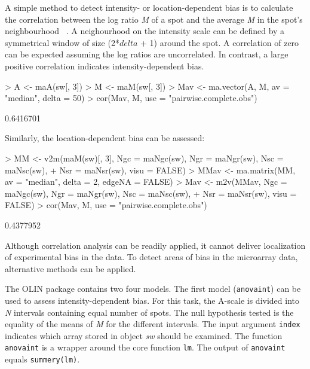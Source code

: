 \documentclass[a4paper,11pt]{article}
\begin{document}
A simple method to detect intensity- or location-dependent  bias is to calculate the 
correlation between the log ratio \emph{M} of a spot and the average \emph{M} in the spot's 
neighbourhood ~\cite{jo}. A neighourhood on the intensity scale can be defined by a symmetrical
window of size (2*$delta$ + 1) around the spot. A correlation of zero can be expected assuming
the log ratios are uncorrelated. In contrast, a large positive correlation indicates intensity-dependent
 bias.

\begin{Schunk}
\begin{Sinput}
> A <- maA(sw[, 3])
> M <- maM(sw[, 3])
> Mav <- ma.vector(A, M, av = "median", delta = 50)
> cor(Mav, M, use = "pairwise.complete.obs")
\end{Sinput}
\begin{Soutput}
          [,1]
[1,] 0.6416701
\end{Soutput}
\end{Schunk}

Similarly, the location-dependent bias can be assessed: 

\begin{Schunk}
\begin{Sinput}
> MM <- v2m(maM(sw)[, 3], Ngc = maNgc(sw), Ngr = maNgr(sw), Nsc = maNsc(sw), 
+     Nsr = maNsr(sw), visu = FALSE)
> MMav <- ma.matrix(MM, av = "median", delta = 2, edgeNA = FALSE)
> Mav <- m2v(MMav, Ngc = maNgc(sw), Ngr = maNgr(sw), Nsc = maNsc(sw), 
+     Nsr = maNsr(sw), visu = FALSE)
> cor(Mav, M, use = "pairwise.complete.obs")
\end{Sinput}
\begin{Soutput}
          [,1]
[1,] 0.4377952
\end{Soutput}
\end{Schunk}

Although correlation analysis can be readily applied, it  cannot 
deliver localization of experimental bias in the data. 
To detect areas of bias in the microarray data, alternative methods can be applied. 

The OLIN package contains two four models. The first model (\texttt{anovaint}) can be used
to assess intensity-dependent bias. For this task, the A-scale is divided into \emph{N} intervals
containing equal number of spots. The null hypothesis tested is the equality of the means of \emph{M} for the different intervals.  The input argument \texttt{index} indicates which array stored in object \emph{sw}
 should
be examined. 
The function \texttt{anovaint}  is a wrapper around the core function \texttt{lm}. 
The output of  \texttt{anovaint} equals \texttt{summery(lm)}.
\end{document}
